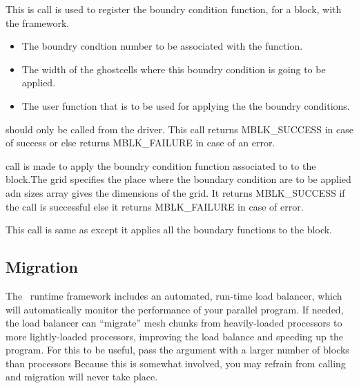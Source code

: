 \documentclass[10pt]{article}
\begin{document}
This is call is used to register the boundry condition function, for a block,
with the framework.
\begin{itemize}
	\item {} The boundry condtion number to be associated with the 
	function.
	\item {} The width of the ghostcells where this boundry
	condition is going to be applied.
	\item {} The user function that is to be used for applying the
	the boundry conditions.
\end{itemize}
 should only be called from the driver.
This call returns MBLK\_SUCCESS in case of success or else returns MBLK\_FAILURE
in case of an error.
\vspace{0.2in}


 call is made to apply the boundry condition function
associated to  to the block.The grid specifies the place where 
the boundary condition are to be applied adn sizes array gives the dimensions
of the grid.
It returns MBLK\_SUCCESS if the call is successful else it returns
MBLK\_FAILURE in case of error. 

This call is same as  except it applies all the boundary 
functions to the block.

\subsection{Migration}

The \charmpp\ runtime framework includes an automated, run-time load balancer,
which will automatically monitor the performance of your parallel program.
If needed, the load balancer can ``migrate'' mesh chunks from heavily-loaded
processors to more lightly-loaded processors, improving the load balance and
speeding up the program.  For this to be useful, pass the  argument
with a larger number of blocks  than processors
Because this is somewhat involved, you may refrain from calling 
 and migration will never take place.
\end{document}
